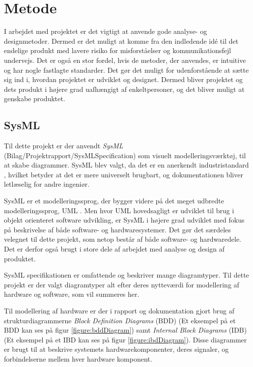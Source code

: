 \chapter{Metode}
I arbejdet med projektet er det vigtigt at anvende gode analyse- og designmetoder. Dermed er det muligt at komme fra den indledende idé til det endelige produkt med lavere risiko for misforståelser og kommunikationsfejl undervejs. Det er også en stor fordel, hvis de metoder, der anvendes, er intuitive og har nogle fastlagte standarder. Det gør det muligt for udenforstående at sætte sig ind i, hvordan projektet er udviklet og designet. Dermed bliver projektet og dets produkt i højere grad uafhængigt af enkeltpersoner, og det bliver muligt at genskabe produktet.

\section{SysML}
Til dette projekt er der anvendt \textit{SysML} \cite{sysml} (Bilag/Projektrapport/SysMLSpecification) som visuelt modelleringsværktøj, til at skabe diagrammer. SysML blev valgt, da det er en anerkendt industristandard \cite{sysml}, hvilket betyder at det er mere universelt brugbart, og dokumentationen bliver letlæselig for andre ingeniør. \newline 

\noindent SysML er et modelleringssprog, der bygger videre på det meget udbredte modelleringssprog, UML \cite{uml}. Men hvor UML hovedsagligt er udviklet til brug i objekt orienteret software udvikling, er SysML i højere grad udviklet med fokus på beskrivelse af både software- og hardwaresystemer. Det gør det særdeles velegnet til dette projekt, som netop består af både software- og hardwaredele. Det er derfor også brugt i store dele af arbejdet med analyse og design af produktet. \newline

\noindent SysML specifikationen er omfattende og beskriver mange diagramtyper. Til dette projekt er der valgt diagramtyper alt efter deres nytteværdi for modellering af hardware og software, som vil summeres her.\newline

\noindent Til modellering af hardware er der i rapport og dokumentation gjort brug af strukturdiagrammerne \textit{Block Definition Diagrams} (BDD) (Et eksempel på et BDD kan ses på figur \ref{figure:bddDiagram}) samt \textit{Internal Block Diagrams} (IDB) (Et eksempel på et IBD kan ses på figur \ref{figure:ibdDiagram}). Disse diagrammer er brugt til at beskrive systemets hardwarekomponenter, deres signaler, og forbindelserne mellem hver hardware komponent.\newline

